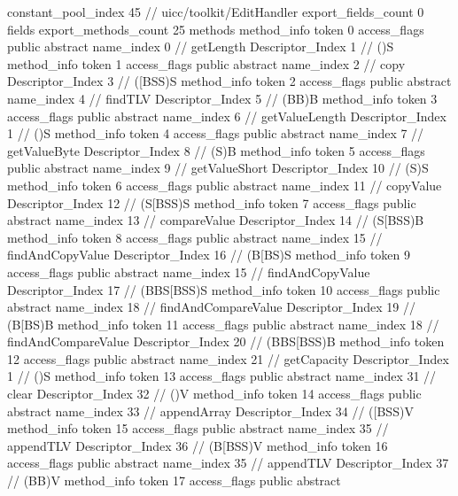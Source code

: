 {{{{				constant_pool_index	45		// uicc/toolkit/EditHandler
			}
			export_fields_count	0
			fields {
			}
			export_methods_count	25
			methods {
				method_info {
					token	0
					access_flags	public abstract
					name_index	0		// getLength
					Descriptor_Index	1		// ()S
				}
				method_info {
					token	1
					access_flags	public abstract
					name_index	2		// copy
					Descriptor_Index	3		// ([BSS)S
				}
				method_info {
					token	2
					access_flags	public abstract
					name_index	4		// findTLV
					Descriptor_Index	5		// (BB)B
				}
				method_info {
					token	3
					access_flags	public abstract
					name_index	6		// getValueLength
					Descriptor_Index	1		// ()S
				}
				method_info {
					token	4
					access_flags	public abstract
					name_index	7		// getValueByte
					Descriptor_Index	8		// (S)B
				}
				method_info {
					token	5
					access_flags	public abstract
					name_index	9		// getValueShort
					Descriptor_Index	10		// (S)S
				}
				method_info {
					token	6
					access_flags	public abstract
					name_index	11		// copyValue
					Descriptor_Index	12		// (S[BSS)S
				}
				method_info {
					token	7
					access_flags	public abstract
					name_index	13		// compareValue
					Descriptor_Index	14		// (S[BSS)B
				}
				method_info {
					token	8
					access_flags	public abstract
					name_index	15		// findAndCopyValue
					Descriptor_Index	16		// (B[BS)S
				}
				method_info {
					token	9
					access_flags	public abstract
					name_index	15		// findAndCopyValue
					Descriptor_Index	17		// (BBS[BSS)S
				}
				method_info {
					token	10
					access_flags	public abstract
					name_index	18		// findAndCompareValue
					Descriptor_Index	19		// (B[BS)B
				}
				method_info {
					token	11
					access_flags	public abstract
					name_index	18		// findAndCompareValue
					Descriptor_Index	20		// (BBS[BSS)B
				}
				method_info {
					token	12
					access_flags	public abstract
					name_index	21		// getCapacity
					Descriptor_Index	1		// ()S
				}
				method_info {
					token	13
					access_flags	public abstract
					name_index	31		// clear
					Descriptor_Index	32		// ()V
				}
				method_info {
					token	14
					access_flags	public abstract
					name_index	33		// appendArray
					Descriptor_Index	34		// ([BSS)V
				}
				method_info {
					token	15
					access_flags	public abstract
					name_index	35		// appendTLV
					Descriptor_Index	36		// (B[BSS)V
				}
				method_info {
					token	16
					access_flags	public abstract
					name_index	35		// appendTLV
					Descriptor_Index	37		// (BB)V
				}
				method_info {
					token	17
					access_flags	public abstract
}}}}}
